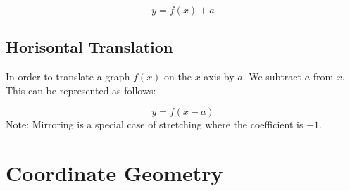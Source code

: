 \documentclass{article}
\begin{document}
\begin{equation}
	y = f(x) + a
\end{equation}
\subsection{Horisontal Translation}
In order to translate a graph $f(x)$ on the $x$ axis by $a$. We subtract $a$ from $x$. This can be
represented as follows:

\begin{equation}
	y = f(x - a)
\end{equation}
Note: Mirroring is a special case of stretching where the coefficient is $-1$.

\section{Coordinate Geometry}
\end{document}
